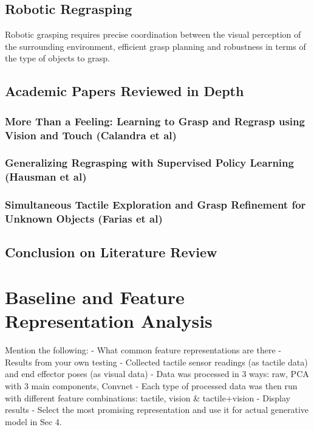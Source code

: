 \documentclass[a4paper]{report}
\begin{document}
\section{Robotic Regrasping}
\label{sec:2.1}
Robotic grasping requires precise coordination between the visual perception of the surrounding environment, efficient grasp planning and robustness in terms of the type of objects to grasp. 


\section{Academic Papers Reviewed in Depth}
\label{}
\subsection{More Than a Feeling: Learning to Grasp and Regrasp using Vision and Touch (Calandra et al)\cite{calandra}}
\label{}


\subsection{Generalizing Regrasping with Supervised Policy Learning (Hausman et al)\cite{hausman}}
\label{}


\subsection{Simultaneous Tactile Exploration and Grasp Refinement for Unknown Objects (Farias et al)\cite{farias}}
\label{}

\section{Conclusion on Literature Review}



\chapter{Baseline and Feature Representation Analysis}
\label{chap:3}
Mention the following:
- What common feature representations are there
- Results from your own testing
    - Collected tactile sensor readings (as tactile data) and end effector poses (as visual data)
    - Data was processed in 3 ways: raw, PCA with 3 main components, Convnet
    - Each type of processed data was then run with different feature combinations: tactile, vision \& tactile+vision
    - Display results
- Select the most promising representation and use it for actual generative model in Sec 4.
\end{document}
